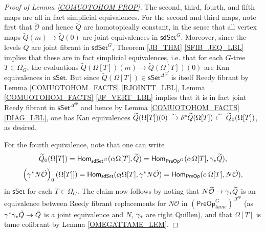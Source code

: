 \documentclass[a4paper,10pt
,draft
]{article}%
\numberwithin{equation}{section}
\numberwithin{figure}{section}
\theoremstyle{definition} %
\newcommand{\sSet}{\ensuremath{\mathsf{sSet}}}%
\DeclareMathOperator{\Aut}{Aut}%
\renewcommand{\O}{\ensuremath{\mathcal O}}
\newcommand{\1}{\ensuremath{\mathbbm 1}}%
\begin{document}
\begin{proof}[Proof of Lemma \ref{COMUOTOHOM PROP}]

      
      The second, third, fourth, and fifth maps are all in fact simplicial equivalences.
      For the second and third maps, note first that $\widetilde{\O}$ and hence
      $\widetilde{Q}$ are homotopically constant, in the sense that
      all vertex maps $\widetilde{Q}(m) \to \widetilde{Q}(0)$ are joint equivalences in $\mathsf{sdSet}^G$.
      Moreover, since the levels $\widetilde{Q}$ are joint fibrant in $\mathsf{sdSet}^G$,
      Theorem \ref{JB_THM} \ref{SFIB_JEQ_LBL} %
      implies that these are in fact simplicial equivalences, %
      i.e. that for each $G$-tree $T \in \Omega_G$, the evaluations %
      $\widetilde{Q}(\Omega[T])(m) \to \widetilde{Q}(\Omega[T])(0)$
      are Kan equivalences in $\mathsf{sSet}$.  %
      But since $\widetilde{Q}(\Omega[T]) \in \sSet^{\Delta^{op}}$ %
      is itself Reedy fibrant by
      Lemma \ref{COMUOTOHOM_FACTS} \ref{RJOINTT_LBL},
      Lemma \ref{COMUOTOHOM_FACTS} \ref{JF_VERT_LBL} %
      implies that it is in fact joint Reedy fibrant in $\mathsf{sSet}^{\Delta^{op}}$ %
      and hence by Lemma \ref{COMUOTOHOM_FACTS} \ref{DIAG_LBL}, %
      one has Kan equivalences %
      $\widetilde{Q}(\Omega[T])(0) \xrightarrow{\sim}
      \delta^{\**} \widetilde{Q}(\Omega[T]) \xleftarrow{\sim}
      \widetilde{Q}_0(\Omega[T])$, as desired.
      
      For the fourth equivalence, note that one can write
      \[
            \widetilde{Q}_0(\Omega[T]) = 
            \mathsf{Hom}_{\mathsf{sdSet}^G}(c_!\Omega[T],\widetilde{Q})=
            \mathsf{Hom}_{\mathsf{PreOp}^G}(c_!\Omega[T],\gamma_{\**}\widetilde{Q}),
      \] 
      \[
            \left(\gamma^{\**} N \widetilde{\mathcal{O}}\right)_0(\Omega[T]]) = 
            \mathsf{Hom}_{\mathsf{sdSet}}(c_!\Omega[T],\gamma^{\**} N \widetilde{\mathcal{O}})=
            \mathsf{Hom}_{\mathsf{PreOp}}(c_!\Omega[T], N \widetilde{\mathcal{O}}),
      \]
      in $\sSet$ for each $T \in \Omega_G$. %
      The claim now follows by noting that
      $N \widetilde{\mathcal{O}} \to \gamma_{\**} \widetilde{Q}$
      is an equivalence between Reedy fibrant replacements for $N \mathcal O$ in $(\mathsf{PreOp}^G_{tame})^{\Delta^{op}}$
      (as $\gamma^{\**}\gamma_{\**}\tilde Q \to \tilde Q$ is a joint equivalence and $N$, $\gamma_{\**}$ are right Quillen),
      and that $\Omega[T]$ is tame cofibrant by Lemma \ref{OMEGATTAME_LEM}.
      

\end{proof}
\end{document}
